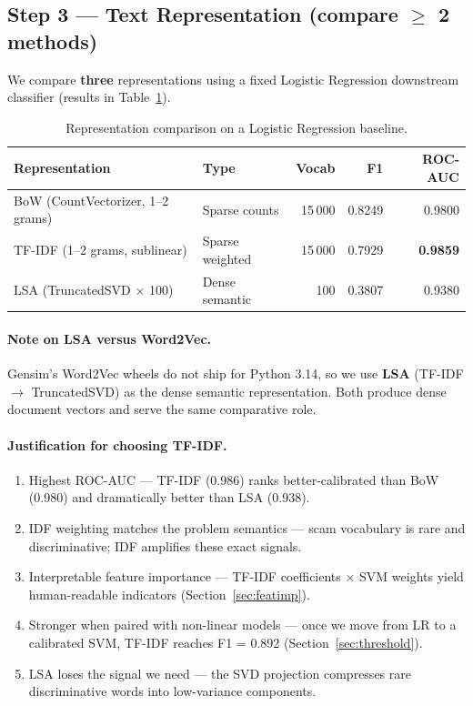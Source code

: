 \documentclass[11pt,a4paper]{article}
\begin{document}
\subsection{Step 3 --- Text Representation (compare $\geq$ 2 methods)}
\label{sec:rep}

We compare \textbf{three} representations using a fixed Logistic Regression
downstream classifier (results in Table~\ref{tab:reps}).

\begin{table}[H]
\centering
\caption{Representation comparison on a Logistic Regression baseline.}
\label{tab:reps}
\begin{tabular}{l l r r r}
\toprule
\textbf{Representation} & \textbf{Type} & \textbf{Vocab} & \textbf{F1} & \textbf{ROC-AUC} \\
\midrule
BoW (CountVectorizer, 1--2 grams) & Sparse counts   & 15\,000 & 0.8249 & 0.9800 \\
TF-IDF (1--2 grams, sublinear)    & Sparse weighted & 15\,000 & 0.7929 & \textbf{0.9859} \\
LSA (TruncatedSVD ${\times}$ 100) & Dense semantic  & 100     & 0.3807 & 0.9380 \\
\bottomrule
\end{tabular}
\end{table}

\paragraph{Note on LSA versus Word2Vec.} Gensim's Word2Vec wheels do not ship
for Python 3.14, so we use \textbf{LSA} (TF-IDF $\to$ TruncatedSVD) as the
dense semantic representation. Both produce dense document vectors and serve
the same comparative role.

\paragraph{Justification for choosing TF-IDF.}
\begin{enumerate}
    \item Highest ROC-AUC --- TF-IDF (0.986) ranks better-calibrated than
          BoW (0.980) and dramatically better than LSA (0.938).
    \item IDF weighting matches the problem semantics --- scam vocabulary
          is rare and discriminative; IDF amplifies these exact signals.
    \item Interpretable feature importance --- TF-IDF coefficients
          $\times$ SVM weights yield human-readable indicators
          (Section~\ref{sec:featimp}).
    \item Stronger when paired with non-linear models --- once we move
          from LR to a calibrated SVM, TF-IDF reaches F1 = 0.892
          (Section~\ref{sec:threshold}).
    \item LSA loses the signal we need --- the SVD projection compresses
          rare discriminative words into low-variance components.
\end{enumerate}
\end{document}
